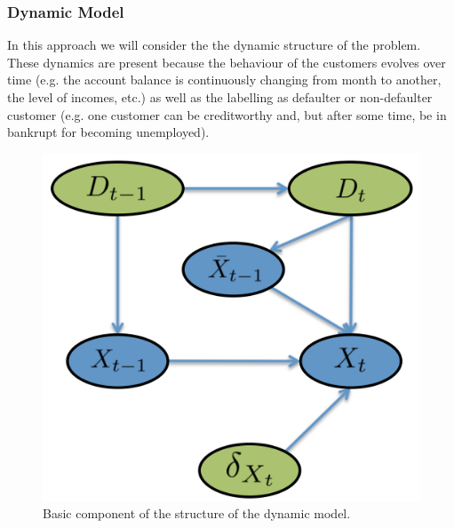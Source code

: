 \subsubsection*{Dynamic Model} 

In this approach we will consider the the dynamic structure of the problem. These dynamics are present because the behaviour of the customers evolves over time (e.g. the account balance is continuously changing from month to another, the level of incomes, etc.)  as well as the labelling as defaulter or non-defaulter customer (e.g. one customer can be creditworthy and, but after some time, be in bankrupt for becoming unemployed). 


\begin{figure}
\begin{center}
\includegraphics[scale=0.35]{./figures/CajaMarModel2}
\caption{Basic component of the structure of the dynamic model.}
\label{fig:component}
\end{center}
\end{figure}

